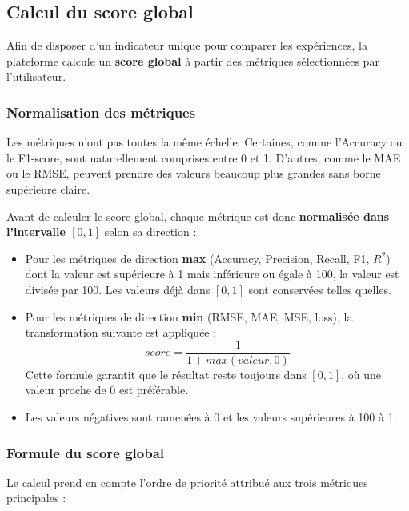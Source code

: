 \subsection{Calcul du score global}
\label{subsec:sprint2-global-score}

Afin de disposer d'un indicateur unique pour comparer les expériences,
la plateforme calcule un \textbf{score global} à partir des métriques
sélectionnées par l'utilisateur.

\subsubsection{Normalisation des métriques}

Les métriques n'ont pas toutes la même échelle. Certaines, comme
l'Accuracy ou le F1-score, sont naturellement comprises entre 0 et 1.
D'autres, comme le MAE ou le RMSE, peuvent prendre des valeurs
beaucoup plus grandes sans borne supérieure claire.

Avant de calculer le score global, chaque métrique est donc
\textbf{normalisée dans l'intervalle $[0, 1]$} selon sa direction :

\begin{itemize}
    \item Pour les métriques de direction \textbf{max} (Accuracy,
    Precision, Recall, F1, $R^2$) dont la valeur est supérieure à 1
    mais inférieure ou égale à 100, la valeur est divisée par 100.
    Les valeurs déjà dans $[0, 1]$ sont conservées telles quelles.

    \item Pour les métriques de direction \textbf{min} (RMSE, MAE,
    MSE, loss), la transformation suivante est appliquée :
    \[
    score = \frac{1}{1 + max(valeur, 0)}
    \]
    Cette formule garantit que le résultat reste toujours dans
    $[0, 1]$, où une valeur proche de 0 est préférable.

    \item Les valeurs négatives sont ramenées à 0 et les valeurs
    supérieures à 100 à 1.
\end{itemize}

\subsubsection{Formule du score global}

Le calcul prend en compte l'ordre de priorité attribué aux trois
métriques principales :

